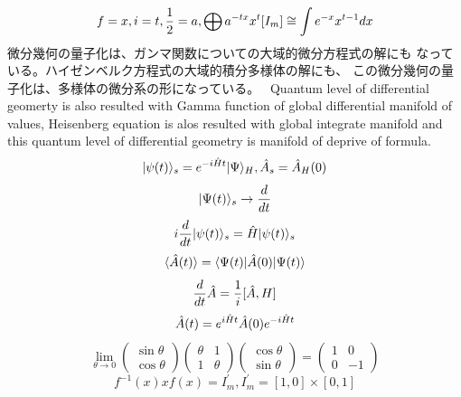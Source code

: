 \documentclass{jsarticle}
\begin{document}
    $$ f = x, i = t, {1 \over 2} = a, \bigoplus a^{-t x}x^t [I_m]
     \cong \int e^{-x} x^{t - 1}dx $$
    微分幾何の量子化は、ガンマ関数についての大域的微分方程式の解にも
    なっている。ハイゼンベルク方程式の大域的積分多様体の解にも、
    この微分幾何の量子化は、多様体の微分系の形になっている。　
    Quantum level of differential geomerty is also resulted with
    Gamma function of global differential manifold of values, Heisenberg
    equation is alos resulted with global integrate manifold and this
    quantum level of differential geometry is manifold of deprive of formula.
    $$ |\psi(t)\rangle_s = e^{-i\Hat{H} t}|\Psi\rangle_{H},
    \Hat{A}_s = \Hat{A}_H(0) $$
    $$ |\Psi(t)\rangle_s \to {d \over dt} $$
    $$ i {d \over dt}|\psi (t) \rangle_s = \Hat{H}|\psi(t)\rangle_s $$
    $$ \langle\Hat{A}(t)\rangle = \langle\Psi(t)|\Hat{A}(0)|\Psi(t)\rangle  $$
    $$ {d \over dt}\Hat{A} = {1 \over i}[\Hat{A},H] $$
    $$ \Hat{A}(t) = e^{i\Hat{H}t}\Hat{A}(0)e^{-i\Hat{H}t} $$
    $$ \lim_{\theta \to 0} \begin{pmatrix} \sin \theta \\
    \cos \theta \end{pmatrix} \begin{pmatrix} \theta & 1 \\
    1 & \theta \end{pmatrix} \begin{pmatrix} \cos \theta \\
    \sin \theta \end{pmatrix} = \begin{pmatrix} 1 & 0 \\
    0 & - 1 \end{pmatrix} $$
    $$ f^{-1}(x) x f(x) = I^{'}_m, I^{'}_m = [1,0] \times [0,1] $$
\end{document}
